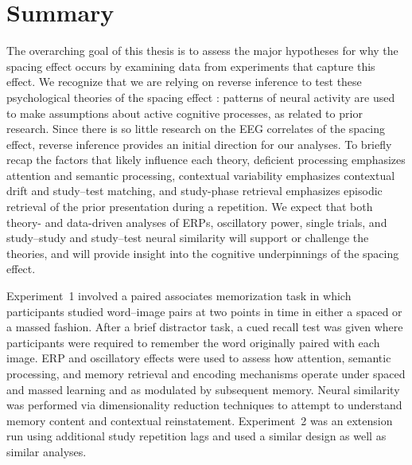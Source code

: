 
\section{Summary}


The overarching goal of this thesis is to assess the major hypotheses for why the spacing effect occurs by examining data from experiments that capture this effect.
We recognize that we are relying on reverse inference to test these psychological theories of the spacing effect \cite{Pold2006,PoldWagn2004}: patterns of neural activity are used to make assumptions about active cognitive processes, as related to prior research.  Since there is so little research on the EEG correlates of the spacing effect, reverse inference provides an initial direction for our analyses.
To briefly recap the factors that likely influence each theory, deficient processing emphasizes attention and semantic processing, contextual variability emphasizes contextual drift and study--test matching, and study-phase retrieval emphasizes episodic retrieval of the prior presentation during a repetition.
We expect that both theory- and data-driven analyses of ERPs, oscillatory power, single trials, and study--study and study--test neural similarity will support or challenge the theories, and will provide insight into the cognitive underpinnings of the spacing effect.

Experiment~1 involved a paired associates memorization task in which participants studied word--image pairs at two points in time in either a spaced or a massed fashion.  After a brief distractor task, a cued recall test was given where participants were required to remember the word originally paired with each image.
ERP and oscillatory effects were used to assess how attention, semantic processing, and memory retrieval and encoding mechanisms operate under spaced and massed learning and as modulated by subsequent memory.  Neural similarity was performed via dimensionality reduction techniques to attempt to understand memory content and contextual reinstatement.
Experiment~2 was an extension run using additional study repetition lags and used a similar design as well as similar analyses.


